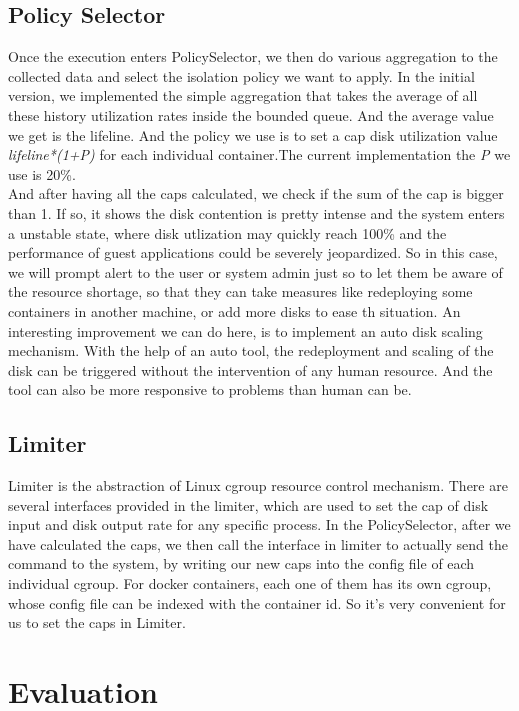 \documentclass[10pt, conference,compsoc]{IEEEtran}
\begin{document}
\subsection{Policy Selector}
Once the execution enters PolicySelector, we then do various aggregation to the collected data and select the isolation policy we want to apply. In the initial version, we implemented the simple aggregation that takes the average of all these history utilization rates inside the bounded queue. And the average value we get is the lifeline. And the policy we use is to set a cap disk utilization value \textit{lifeline*(1+P)} for each individual container.The current implementation the \textit{P} we use is 20\%. \\

And after having all the caps calculated, we check if the sum of the cap is bigger than 1. If so, it shows the disk contention is pretty intense and the system enters a unstable state, where disk utlization may quickly reach 100\% and the performance of guest applications could be severely jeopardized. So in this case, we will prompt alert to the user or system admin just so to let them be aware of the resource shortage, so that they can take measures like redeploying some containers in another machine, or add more disks to ease th situation. An interesting improvement we can do here, is to implement an auto disk scaling mechanism. With the help of an auto tool, the redeployment and scaling of the disk can be triggered without the intervention of any human resource. And the tool can also be more responsive to problems than human can be.\\


\subsection{Limiter}
Limiter is the abstraction of Linux cgroup resource control mechanism. There are several interfaces provided in the limiter, which are used to set the cap of disk input and disk output rate for any specific process. In the PolicySelector, after we have calculated the caps, we then call the interface in limiter to actually send the command to the system, by writing our new caps into the config file of each individual cgroup. For docker containers, each one of them has its own cgroup, whose config file can be indexed with the container id. So it's very convenient for us to set the caps in Limiter.


\section{Evaluation}
\end{document}
